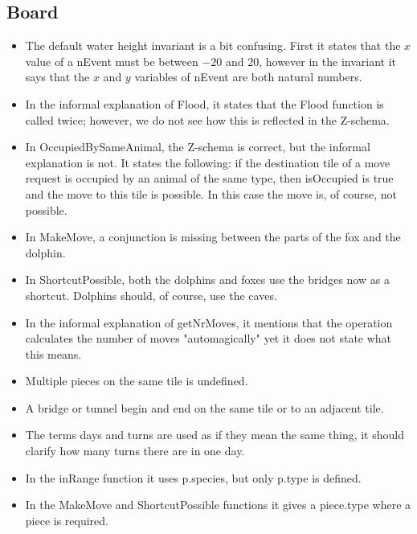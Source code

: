 \documentclass[a4paper,11pt]{article}
\begin{document}
    \subsection{Board}
    \begin{itemize}
        \item The default water height invariant is a bit confusing. First it states that the $x$ value of a nEvent must be between $-20$ and $20$, however in the invariant it says that the $x$ and $y$ variables of nEvent are both natural numbers.
        \item In the informal explanation of Flood, it states that the Flood function is called twice; however, we do not see how this is reflected in the Z-schema.
        \item In OccupiedBySameAnimal, the Z-schema is correct, but the informal explanation is not. It states the following: if the destination tile of a move request is occupied by an animal of the same type, then isOccupied is true and the move to this tile is possible. In this case the move is, of course, not possible.
        \item In MakeMove, a conjunction is missing between the parts of the fox and the dolphin.
        \item In ShortcutPossible, both the dolphins and foxes use the bridges now as a shortcut. Dolphins should, of course, use the caves.
        \item In the informal explanation of getNrMoves, it mentions that the operation calculates the number of moves "automagically" yet it does not state what this means.
        \item Multiple pieces on the same tile is undefined.
        \item A bridge or tunnel begin and end on the same tile or to an adjacent tile.
        \item The terms days and turns are used as if they mean the same thing, it should clarify how many turns there are in one day.
        \item In the inRange function it uses p.species, but only p.type is defined.
        \item In the MakeMove and ShortcutPossible functions it gives a piece.type where a piece is required.
    \end{itemize}
\end{document}
